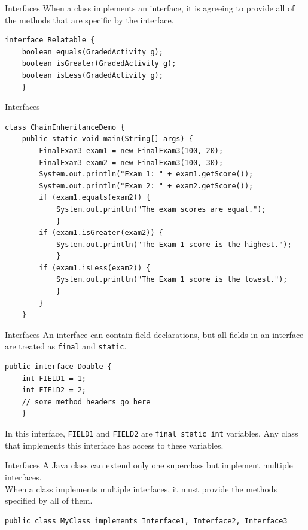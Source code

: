 \documentclass[11pt]{beamer}
\begin{document}
\begin{frame}[fragile]{Interfaces}
    When a class implements an interface, it is agreeing to provide all of the methods that are specific by the interface.
    \begin{lstlisting}
interface Relatable {
    boolean equals(GradedActivity g);
    boolean isGreater(GradedActivity g);
    boolean isLess(GradedActivity g);
    }
    \end{lstlisting}
\end{frame}

\begin{frame}[fragile]{Interfaces}
    \begin{lstlisting}[basicstyle=\ttfamily\footnotesize]
class ChainInheritanceDemo {
    public static void main(String[] args) {
        FinalExam3 exam1 = new FinalExam3(100, 20);
        FinalExam3 exam2 = new FinalExam3(100, 30);
        System.out.println("Exam 1: " + exam1.getScore());
        System.out.println("Exam 2: " + exam2.getScore());
        if (exam1.equals(exam2)) {
            System.out.println("The exam scores are equal.");
            }
        if (exam1.isGreater(exam2)) {
            System.out.println("The Exam 1 score is the highest.");
            }
        if (exam1.isLess(exam2)) {
            System.out.println("The Exam 1 score is the lowest.");
            }
        }
    }
    \end{lstlisting}
\end{frame}

\begin{frame}[fragile]{Interfaces}
    An interface can contain field declarations, but all fields in an interface are treated as \texttt{final} and \texttt{static}.
    \begin{lstlisting}
public interface Doable {
    int FIELD1 = 1;
    int FIELD2 = 2;
    // some method headers go here
    }
    \end{lstlisting}
    In this interface, \texttt{FIELD1} and \texttt{FIELD2} are \texttt{final static int} variables. Any class that implements this interface has access to these variables.
\end{frame}

\begin{frame}[fragile]{Interfaces}
    A Java class can extend only one superclass but implement multiple interfaces. \\ \vspace{1em}
    When a class implements multiple interfaces, it must provide the methods specified by all of them.
    \begin{lstlisting}[basicstyle=\ttfamily\footnotesize]
public class MyClass implements Interface1, Interface2, Interface3
    \end{lstlisting}
\end{frame}
\end{document}
